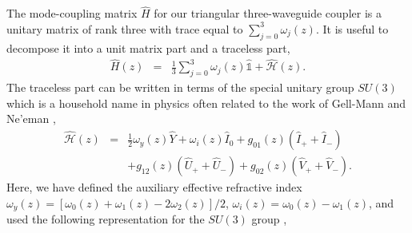 \documentclass[9pt,twocolumn,twoside]{osajnl}
\begin{document}
The mode-coupling matrix $\hat{H}$ for our triangular three-waveguide coupler is a unitary matrix of rank three with trace equal to $\sum_{j=0}^{3} \omega_{j}(z)$. 
It is useful to decompose it into a unit matrix part and a traceless part, 
\begin{eqnarray}
	\hat{H}(z) &=& \frac{1}{3} \sum_{j=0}^{3} \omega_{j}(z) \hat{\mathbb{1}} + \hat{\mathcal{H}}(z).
\end{eqnarray}
The traceless part can be written in terms of the special unitary group $SU(3)$ which is  a household name in physics often related to the work of Gell-Mann \cite{GellMann1961} and Ne'eman \cite{Neeman1961p222},
\begin{eqnarray}
	\hat{\mathcal{H}}(z)&=& \frac{1}{2} \omega_{y}(z) \hat{Y}  + \omega_{i}(z) \hat{I}_{0}+ g_{01}(z) \left( \hat{I}_{+} + \hat{I}_{-} \right) \nonumber \\
			&&  + g_{12}(z) \left( \hat{U}_{+} + \hat{U}_{-} \right)  +   g_{02}(z) \left( \hat{V}_{+} + \hat{V}_{-} \right). \label{eq:MCMatrix}
\end{eqnarray}
Here, we have defined the auxiliary effective refractive index $\omega_{y}(z) = \left[ \omega_{0}(z) + \omega_{1}(z) - 2 \omega_{2}(z)\right]/2$, $\omega_{i}(z)= \omega_{0}(z)-\omega_{1}(z)$, and used the following representation for the $SU(3)$ group \cite{Ticciati1999}, 
\end{document}
